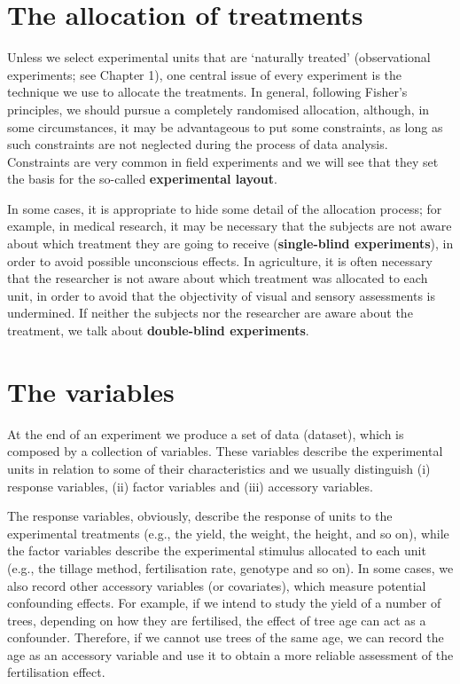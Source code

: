 \documentclass[a4paper,12pt,oneside]{book}
\begin{document}
\hypertarget{the-allocation-of-treatments}{%
\section{The allocation of treatments}\label{the-allocation-of-treatments}}

Unless we select experimental units that are `naturally treated' (observational experiments; see Chapter 1), one central issue of every experiment is the technique we use to allocate the treatments. In general, following Fisher's principles, we should pursue a completely randomised allocation, although, in some circumstances, it may be advantageous to put some constraints, as long as such constraints are not neglected during the process of data analysis. Constraints are very common in field experiments and we will see that they set the basis for the so-called \textbf{experimental layout}.

In some cases, it is appropriate to hide some detail of the allocation process; for example, in medical research, it may be necessary that the subjects are not aware about which treatment they are going to receive (\textbf{single-blind experiments}), in order to avoid possible unconscious effects. In agriculture, it is often necessary that the researcher is not aware about which treatment was allocated to each unit, in order to avoid that the objectivity of visual and sensory assessments is undermined. If neither the subjects nor the researcher are aware about the treatment, we talk about \textbf{double-blind experiments}.

\hypertarget{the-variables}{%
\section{The variables}\label{the-variables}}

At the end of an experiment we produce a set of data (dataset), which is composed by a collection of variables. These variables describe the experimental units in relation to some of their characteristics and we usually distinguish (i) response variables, (ii) factor variables and (iii) accessory variables.

The response variables, obviously, describe the response of units to the experimental treatments (e.g., the yield, the weight, the height, and so on), while the factor variables describe the experimental stimulus allocated to each unit (e.g., the tillage method, fertilisation rate, genotype and so on). In some cases, we also record other accessory variables (or covariates), which measure potential confounding effects. For example, if we intend to study the yield of a number of trees, depending on how they are fertilised, the effect of tree age can act as a confounder. Therefore, if we cannot use trees of the same age, we can record the age as an accessory variable and use it to obtain a more reliable assessment of the fertilisation effect.
\end{document}
